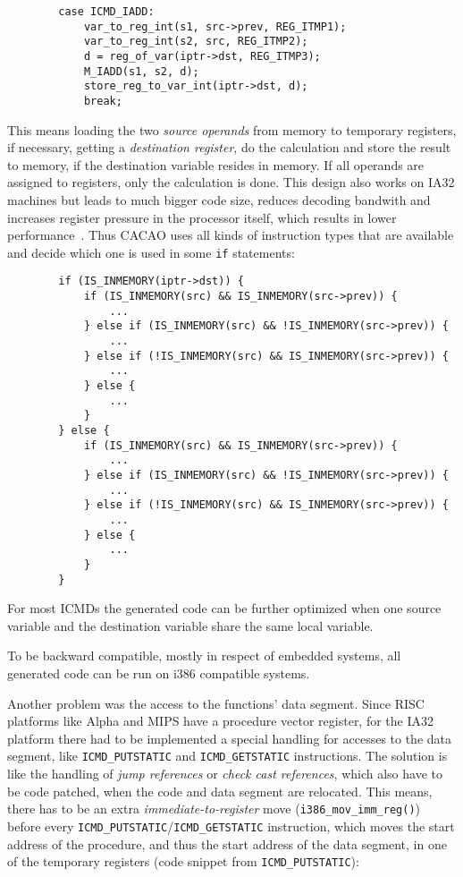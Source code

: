 \begin{verbatim}
        case ICMD_IADD:
            var_to_reg_int(s1, src->prev, REG_ITMP1);
            var_to_reg_int(s2, src, REG_ITMP2);
            d = reg_of_var(iptr->dst, REG_ITMP3);
            M_IADD(s1, s2, d);
            store_reg_to_var_int(iptr->dst, d);
            break;
\end{verbatim}

This means loading the two \textit{source operands} from memory to
temporary registers, if necessary, getting a \textit{destination
register}, do the calculation and store the result to memory, if the
destination variable resides in memory. If all operands are assigned
to registers, only the calculation is done. This design also works on
IA32 machines but leads to much bigger code size, reduces decoding
bandwith and increases register pressure in the processor itself,
which results in lower performance~\cite{IA32opt}. Thus CACAO uses all
kinds of instruction types that are available and decide which one is
used in some \texttt{if} statements:

\begin{verbatim}
        if (IS_INMEMORY(iptr->dst)) {
            if (IS_INMEMORY(src) && IS_INMEMORY(src->prev)) {
                ...
            } else if (IS_INMEMORY(src) && !IS_INMEMORY(src->prev)) {
                ...
            } else if (!IS_INMEMORY(src) && IS_INMEMORY(src->prev)) {
                ...
            } else {
                ...
            }
        } else {
            if (IS_INMEMORY(src) && IS_INMEMORY(src->prev)) {
                ...
            } else if (IS_INMEMORY(src) && !IS_INMEMORY(src->prev)) {
                ...
            } else if (!IS_INMEMORY(src) && IS_INMEMORY(src->prev)) {
                ...
            } else {
                ...
            }
        }
\end{verbatim}

For most ICMDs the generated code can be further optimized when one
source variable and the destination variable share the same local
variable.

To be backward compatible, mostly in respect of embedded systems, all
generated code can be run on i386 compatible systems.

Another problem was the access to the functions' data segment. Since
RISC platforms like Alpha and MIPS have a procedure vector register,
for the IA32 platform there had to be implemented a special handling
for accesses to the data segment, like \texttt{ICMD\_PUTSTATIC} and
\texttt{ICMD\_GETSTATIC} instructions. The solution is like the
handling of \textit{jump references} or \textit{check cast
references}, which also have to be code patched, when the code and
data segment are relocated. This means, there has to be an extra
\textit{immediate-to-register} move (\texttt{i386\_mov\_imm\_reg()})
before every \texttt{ICMD\_PUTSTATIC}/\texttt{ICMD\_GETSTATIC}
instruction, which moves the start address of the procedure, and thus
the start address of the data segment, in one of the temporary
registers (code snippet from \texttt{ICMD\_PUTSTATIC}):

